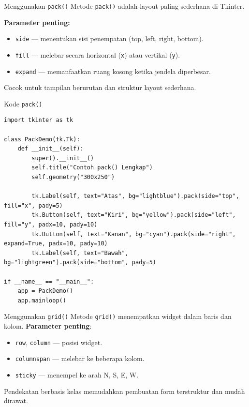 \documentclass[aspectratio=169, table]{beamer}
\begin{document}
\begin{frame}[fragile]{Menggunakan \texttt{pack()}}
\vspace{30pt}
Metode \texttt{pack()} adalah layout paling sederhana di Tkinter.

\textbf{Parameter penting:}
\begin{itemize}
    \item \texttt{side} — menentukan sisi penempatan (top, left, right, bottom).
    \item \texttt{fill} — melebar secara horizontal (\texttt{x}) atau vertikal (\texttt{y}).
    \item \texttt{expand} — memanfaatkan ruang kosong ketika jendela diperbesar.
\end{itemize}

Cocok untuk tampilan berurutan dan struktur layout sederhana.
\end{frame}

\begin{frame}[fragile]{Kode \texttt{pack()}}
\vspace{20pt}
\begin{lstlisting}[style=PythonStyle, basicstyle=\ttfamily\scriptsize]
import tkinter as tk

class PackDemo(tk.Tk):
    def __init__(self):
        super().__init__()
        self.title("Contoh pack() Lengkap")
        self.geometry("300x250")

        tk.Label(self, text="Atas", bg="lightblue").pack(side="top", fill="x", pady=5)
        tk.Button(self, text="Kiri", bg="yellow").pack(side="left", fill="y", padx=10, pady=10)
        tk.Button(self, text="Kanan", bg="cyan").pack(side="right", expand=True, padx=10, pady=10)
        tk.Label(self, text="Bawah", bg="lightgreen").pack(side="bottom", pady=5)

if __name__ == "__main__":
    app = PackDemo()
    app.mainloop()
\end{lstlisting}
\end{frame}



\begin{frame}[fragile]{Menggunakan \texttt{grid()}}
\vspace{30pt}
Metode \texttt{grid()} menempatkan widget dalam baris dan kolom.  
\textbf{Parameter penting}:

\begin{itemize}
    \item \texttt{row}, \texttt{column} — posisi widget.
    \item \texttt{columnspan} — melebar ke beberapa kolom.
    \item \texttt{sticky} — menempel ke arah N, S, E, W.
\end{itemize}

Pendekatan berbasis kelas memudahkan pembuatan form terstruktur dan mudah dirawat.
\end{frame}
\end{document}
